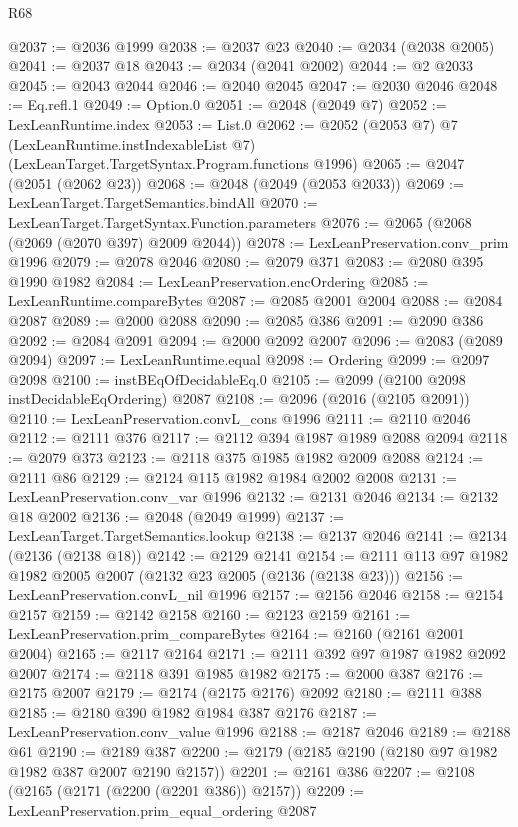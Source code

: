 \begin{lexlean}{R68}
\begin{coremodule}
@2037 := @2036 @1999
@2038 := @2037 @23
@2040 := @2034 (@2038 @2005)
@2041 := @2037 @18
@2043 := @2034 (@2041 @2002)
@2044 := @2 @2033
@2045 := @2043 @2044
@2046 := @2040 @2045
@2047 := @2030 @2046
@2048 := Eq.refl.{1}
@2049 := Option.{0}
@2051 := @2048 (@2049 @7)
@2052 := LexLeanRuntime.index
@2053 := List.{0}
@2062 := @2052
    (@2053 @7)
    @7
    (LexLeanRuntime.instIndexableList @7)
    (LexLeanTarget.TargetSyntax.Program.functions @1996)
@2065 := @2047 (@2051 (@2062 @23))
@2068 := @2048 (@2049 (@2053 @2033))
@2069 := LexLeanTarget.TargetSemantics.bindAll
@2070 := LexLeanTarget.TargetSyntax.Function.parameters
@2076 := @2065 (@2068 (@2069 (@2070 @397) @2009 @2044))
@2078 := LexLeanPreservation.conv_prim @1996
@2079 := @2078 @2046
@2080 := @2079 @371
@2083 := @2080 @395 @1990 @1982
@2084 := LexLeanPreservation.encOrdering
@2085 := LexLeanRuntime.compareBytes
@2087 := @2085 @2001 @2004
@2088 := @2084 @2087
@2089 := @2000 @2088
@2090 := @2085 @386
@2091 := @2090 @386
@2092 := @2084 @2091
@2094 := @2000 @2092 @2007
@2096 := @2083 (@2089 @2094)
@2097 := LexLeanRuntime.equal
@2098 := Ordering
@2099 := @2097 @2098
@2100 := instBEqOfDecidableEq.{0}
@2105 := @2099 (@2100 @2098 instDecidableEqOrdering) @2087
@2108 := @2096 (@2016 (@2105 @2091))
@2110 := LexLeanPreservation.convL_cons @1996
@2111 := @2110 @2046
@2112 := @2111 @376
@2117 := @2112 @394 @1987 @1989 @2088 @2094
@2118 := @2079 @373
@2123 := @2118 @375 @1985 @1982 @2009 @2088
@2124 := @2111 @86
@2129 := @2124 @115 @1982 @1984 @2002 @2008
@2131 := LexLeanPreservation.conv_var @1996
@2132 := @2131 @2046
@2134 := @2132 @18 @2002
@2136 := @2048 (@2049 @1999)
@2137 := LexLeanTarget.TargetSemantics.lookup
@2138 := @2137 @2046
@2141 := @2134 (@2136 (@2138 @18))
@2142 := @2129 @2141
@2154 := @2111 @113 @97 @1982 @1982 @2005 @2007 (@2132 @23 @2005 (@2136 (@2138 @23)))
@2156 := LexLeanPreservation.convL_nil @1996
@2157 := @2156 @2046
@2158 := @2154 @2157
@2159 := @2142 @2158
@2160 := @2123 @2159
@2161 := LexLeanPreservation.prim_compareBytes
@2164 := @2160 (@2161 @2001 @2004)
@2165 := @2117 @2164
@2171 := @2111 @392 @97 @1987 @1982 @2092 @2007
@2174 := @2118 @391 @1985 @1982
@2175 := @2000 @387
@2176 := @2175 @2007
@2179 := @2174 (@2175 @2176) @2092
@2180 := @2111 @388
@2185 := @2180 @390 @1982 @1984 @387 @2176
@2187 := LexLeanPreservation.conv_value @1996
@2188 := @2187 @2046
@2189 := @2188 @61
@2190 := @2189 @387
@2200 := @2179 (@2185 @2190 (@2180 @97 @1982 @1982 @387 @2007 @2190 @2157))
@2201 := @2161 @386
@2207 := @2108 (@2165 (@2171 (@2200 (@2201 @386)) @2157))
@2209 := LexLeanPreservation.prim_equal_ordering @2087

\end{coremodule}
\end{lexlean}
